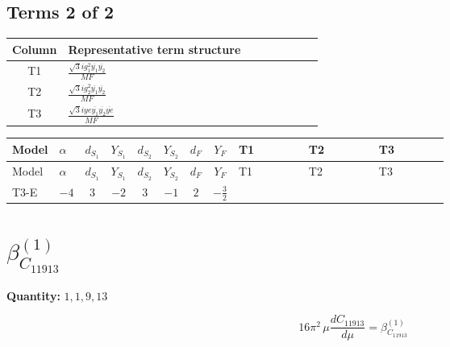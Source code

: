 \documentclass[8pt]{article}
\begin{document}
\begin{landscape}
\subsection*{Terms 2 of 2}
\begin{center}
\begin{tabular}{@{}c >{\raggedright\arraybackslash}p{0.82\linewidth}@{}}
\toprule
Column & Representative term structure \\
\midrule
T1 & \(\displaystyle \frac{\sqrt{3} i g_{1}^{2} \overline{y_{1}} \overline{y_{2}}}{MF}\) \\
\midrule
T2 & \(\displaystyle \frac{\sqrt{3} i g_{2}^{2} \overline{y_{1}} \overline{y_{2}}}{MF}\) \\
\midrule
T3 & \(\displaystyle \frac{\sqrt{3} i ye \overline{y_{1}} \overline{y_{2}} \overline{ye}}{MF}\) \\
\midrule
\bottomrule
\end{tabular}
\end{center}
\smallskip
\tiny
\begin{longtable}{@{}llcccccc >{\raggedright\arraybackslash}p{0.21\linewidth} >{\raggedright\arraybackslash}p{0.21\linewidth} >{\raggedright\arraybackslash}p{0.21\linewidth}@{}}
\toprule
Model & $\alpha$ & $d_{S_1}$ & $Y_{S_1}$ & $d_{S_2}$ & $Y_{S_2}$ & $d_F$ & $Y_F$ & T1 & T2 & T3 \\
\midrule
\endfirsthead
\toprule
Model & $\alpha$ & $d_{S_1}$ & $Y_{S_1}$ & $d_{S_2}$ & $Y_{S_2}$ & $d_F$ & $Y_F$ & T1 & T2 & T3 \\
\midrule
\endhead
T3-E & $-4$ & $3$ & $-2$ & $3$ & $-1$ & $2$ & $-\frac{3}{2}$ & \scriptsize\adjustbox{max width=\linewidth}{$\begin{gathered} \frac{9 \sqrt{3} i g_{1}^{2} \overline{y_{1}} \overline{y_{2}}}{8 MF}\end{gathered}$} & \scriptsize\adjustbox{max width=\linewidth}{$\begin{gathered} \frac{11 \sqrt{3} i g_{2}^{2} \overline{y_{1}} \overline{y_{2}}}{8 MF}\end{gathered}$} & \scriptsize\adjustbox{max width=\linewidth}{$\begin{gathered} - \frac{\sqrt{3} i ye \overline{y_{1}} \overline{y_{2}} \overline{ye}}{12 MF}\end{gathered}$} \\
\midrule
\bottomrule
\end{longtable}
\clearpage
\section*{$\beta_{C_{11913}}^{(1)}$}
\noindent\textbf{Quantity: }$\mathrm{1,1,9,13}$\par\smallskip
\[16\pi^2\,\mu\frac{d C_{11913}}{d\mu}=\beta_{C_{11913}}^{(1)}\]

\end{landscape}
\end{document}
